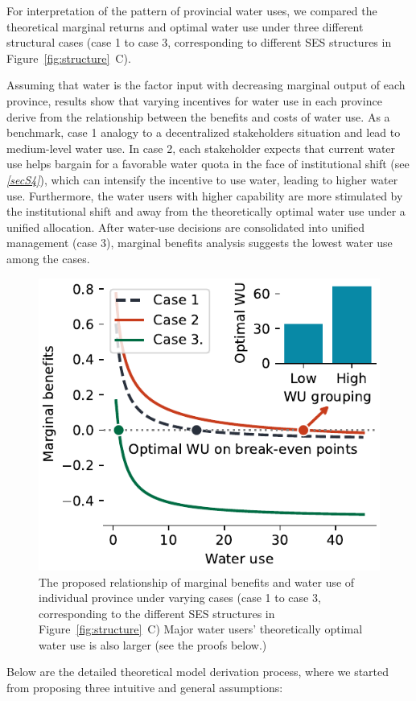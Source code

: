 \documentclass[preprint, 12pt]{elsarticle}
\begin{document}
For interpretation of the pattern of provincial water uses, we compared the theoretical marginal returns and optimal water use under three different structural cases (case 1 to case 3, corresponding to different SES structures in Figure~\ref{fig:structure}~C).

Assuming that water is the factor input with decreasing marginal output of each province, results show that varying incentives for water use in each province derive from the relationship between the benefits and costs of water use.
As a benchmark, case 1 analogy to a decentralized stakeholders situation and lead to medium-level water use.
In case 2, each stakeholder expects that current water use helps bargain for a favorable water quota in the face of institutional shift (see \textit{\ref{secS4}}), which can intensify the incentive to use water, leading to higher water use.
Furthermore, the water users with higher capability are more stimulated by the institutional shift and away from the theoretically optimal water use under a unified allocation.
After water-use decisions are consolidated into unified management (case 3), marginal benefits analysis suggests the lowest water use among the cases.


\begin{figure}[!htb]
	\centering
	\includegraphics[width=0.6\linewidth]{outputs/economic_model.pdf}
	\caption{
		The proposed relationship of marginal benefits and water use of individual province under varying cases (case 1 to case 3, corresponding to the different SES structures in Figure~\ref{fig:structure}~C) Major water users' theoretically optimal water use is also larger (see the proofs below.)}
\end{figure}

Below are the detailed theoretical model derivation process, where we started from proposing three intuitive and general assumptions:
\end{document}
